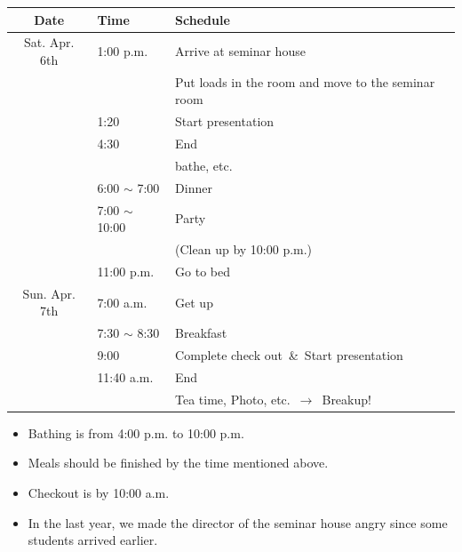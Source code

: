 \documentclass[unicode,a4paper,11pt]{ltjsarticle}
\begin{document}
\begin{center}
      \begin{tabular}{cll}\hline
            Date          & Time               & Schedule                                           \\ \hline
            Sat. Apr. 6th & 1:00 p.m.          & Arrive at seminar house                            \\
                          &                    & Put loads in the room and move to the seminar room \\
                          & 1:20               & Start presentation                                 \\
                          & 4:30               & End                                                \\
                          &                    & bathe, etc.                                        \\
                          & 6:00  $\sim$ 7:00  & Dinner                                             \\
                          & 7:00  $\sim$ 10:00 & Party                                              \\
                          &                    & (Clean up by 10:00 p.m.)                           \\
                          & 11:00 p.m.         & Go to bed                                          \\ \hline
            Sun. Apr. 7th & 7:00 a.m.          & Get up                                             \\
                          & 7:30 $\sim$  8:30  & Breakfast                                          \\
                          & 9:00               & Complete check out\ \&\ Start presentation         \\
                          & 11:40 a.m.         & End                                                \\
                          &                    & Tea time, Photo, etc.\ $\rightarrow$\ Breakup!     \\ \hline
      \end{tabular}
\end{center}

\begin{itemize}
      \item
            Bathing is from  4:00 p.m. to 10:00 p.m.
      \item
            Meals should be finished by the time mentioned above.
      \item
            Checkout is by 10:00 a.m.
      \item
            In the last year, we made the director of the seminar house angry since some students arrived earlier.
\end{itemize}
\end{document}
